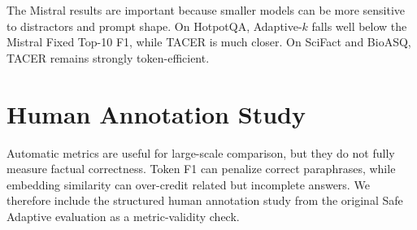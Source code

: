 \documentclass[11pt]{article}
\begin{document}
\begin{table}[t]
\centering
\small
\caption{Model comparison in the TF-IDF setting. Each cell reports F1 / token reduction relative to Fixed Top-10 for that model and dataset.}
\label{tab:model_comparison}
\end{table}

The Mistral results are important because smaller models can be more sensitive to distractors and prompt shape. On HotpotQA, Adaptive-$k$ falls well below the Mistral Fixed Top-10 F1, while TACER is much closer. On SciFact and BioASQ, TACER remains strongly token-efficient.

\section{Human Annotation Study}
\label{sec:human-annotation}

Automatic metrics are useful for large-scale comparison, but they do not fully measure factual correctness. Token F1 can penalize correct paraphrases, while embedding similarity can over-credit related but incomplete answers. We therefore include the structured human annotation study from the original Safe Adaptive evaluation as a metric-validity check.
\end{document}

